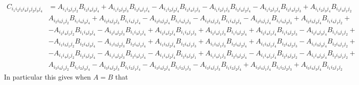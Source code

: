 \documentclass[aps,preprint]{revtex4}%
\begin{document}
\begin{align}
C_{i_{1}i_{2}i_{3}i_{4}j_{1}j_{2}j_{3}j_{4}}  & =A_{i_{1}i_{2}j_{1}j_{2}%
}B_{i_{3}i_{4}j_{3}j_{4}}+A_{i_{1}i_{2}j_{2}j_{3}}B_{i_{3}i_{4}j_{1}j_{4}%
}-A_{i_{1}i_{2}j_{2}j_{4}}B_{i_{3}i_{4}j_{1}j_{3}}-A_{i_{1}i_{2}j_{1}j_{3}%
}B_{i_{3}i_{4}j_{2}j_{4}}-A_{i_{1}i_{2}j_{1}j_{4}}B_{i_{3}i_{4}j_{2}j_{3}%
}+A_{i_{1}i_{2}j_{3}j_{4}}B_{i_{3}i_{4}j_{1}j_{2}}\nonumber\\
& A_{i_{2}i_{3}j_{1}j_{2}}B_{i_{1}i_{4}j_{3}j_{4}}+A_{i_{2}i_{3}j_{2}j_{3}%
}B_{i_{1}i_{4}j_{1}j_{4}}-A_{i_{2}i_{3}j_{2}j_{4}}B_{i_{1}i_{4}j_{1}j_{3}%
}-A_{i_{2}i_{3}j_{1}j_{3}}B_{i_{1}i_{4}j_{2}j_{4}}-A_{i_{2}i_{3}j_{1}j_{4}%
}B_{i_{1}i_{4}j_{2}j_{3}}+A_{i_{2}i_{3}j_{3}j_{4}}B_{i_{1}i_{4}j_{1}j_{2}%
}+\nonumber\\
& -A_{i_{2}i_{4}j_{1}j_{2}}B_{i_{1}i_{3}j_{3}j_{4}}-A_{i_{2}i_{4}j_{2}j_{3}%
}B_{i_{1}i_{3}j_{1}j_{4}}+A_{i_{2}i_{4}j_{2}j_{4}}B_{i_{1}i_{3}j_{1}j_{3}%
}+A_{i_{2}i_{4}j_{1}j_{3}}B_{i_{1}i_{3}j_{2}j_{4}}+A_{i_{2}i_{4}j_{1}j_{4}%
}B_{i_{1}i_{3}j_{2}j_{3}}-A_{i_{2}i_{4}j_{3}j_{4}}B_{i_{1}i_{3}j_{1}j_{2}%
}+\nonumber\\
& -A_{i_{1}i_{3}j_{1}j_{2}}B_{i_{2}i_{4}j_{3}j_{4}}-A_{i_{1}i_{3}j_{2}j_{3}%
}B_{i_{2}i_{4}j_{1}j_{4}}+A_{i_{1}i_{3}j_{2}j_{4}}B_{i_{2}i_{4}j_{1}j_{3}%
}+A_{i_{1}i_{3}j_{1}j_{3}}B_{i_{2}i_{4}j_{2}j_{4}}+A_{i_{1}i_{3}j_{1}j_{4}%
}B_{i_{2}i_{4}j_{2}j_{3}}-A_{i_{1}i_{3}j_{3}j_{4}}B_{i_{2}i_{4}j_{1}j_{2}%
}+\nonumber\\
& -A_{i_{1}i_{4}j_{1}j_{2}}B_{i_{2}i_{3}j_{3}j_{4}}-A_{i_{1}i_{4}j_{2}j_{3}%
}B_{i_{2}i_{3}j_{1}j_{4}}-A_{i_{1}i_{4}j_{2}j_{4}}B_{i_{2}i_{3}j_{3}j_{1}%
}+A_{i_{1}i_{4}j_{1}j_{3}}B_{i_{2}i_{3}j_{2}j_{4}}-A_{i_{1}i_{4}j_{1}j_{4}%
}B_{i_{2}i_{3}j_{3}j_{2}}-A_{i_{1}i_{4}j_{3}j_{4}}B_{i_{2}i_{3}j_{1}j_{2}%
}+\nonumber\\
& A_{i_{3}i_{4}j_{1}j_{2}}B_{i_{1}i_{2}j_{3}j_{4}}-A_{i_{3}i_{4}j_{2}j_{3}%
}B_{i_{1}i_{2}j_{1}j_{4}}-A_{i_{3}i_{4}j_{2}j_{4}}B_{i_{1}i_{2}j_{1}j_{3}%
}-A_{i_{3}i_{4}j_{1}j_{3}}B_{i_{1}i_{2}j_{2}j_{4}}+A_{i_{3}i_{4}j_{1}j_{4}%
}B_{i_{1}i_{2}j_{2}j_{3}}+A_{i_{3}i_{4}j_{3}j_{4}}B_{i_{1}i_{2}j_{1}j_{2}}%
\end{align}
In particular this gives when $A=B$ that
\end{document}
